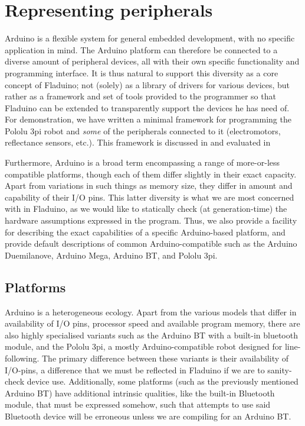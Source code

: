 \documentclass[a4paper, oneside, final]{memoir}
\let\Fref\undefined
\begin{document}
\section{Representing peripherals} 

Arduino is a flexible system for general embedded development, with no
specific application in mind.  The Arduino platform can therefore be
connected to a diverse amount of peripheral devices, all with their
own specific functionality and programming interface.  It is thus
natural to support this diversity as a core concept of Fladuino; not
(solely) as a library of drivers for various devices, but rather as a
framework and set of tools provided to the programmer so that Fladuino
can be extended to transparently support the devices he has need of.
For demonstration, we have written a minimal framework for programming
the Pololu 3pi robot and \textit{some} of the peripherals connected to
it (electromotors, reflectance sensors, etc.). This framework is
discussed in \Fref[plain]{chap:example code} and evaluated in
\Fref[plain]{chap:evaluation}

Furthermore, Arduino is a broad term encompassing a range of
more-or-less compatible platforms, though each of them differ slightly
in their exact capacity.  Apart from variations in such things as
memory size, they differ in amount and capability of their I/O pins.
This latter diversity is what we are most concerned with in Fladuino,
as we would like to statically check (at generation-time) the hardware
assumptions expressed in the program.  Thus, we also provide a
facility for describing the exact capabilities of a specific
Arduino-based platform, and provide default descriptions of common
Arduino-compatible such as the Arduino Duemilanove, Arduino Mega,
Arduino BT, and Pololu 3pi.



\subsection{Platforms}
\label{sec:platforms}

Arduino is a heterogeneous ecology.  Apart from the various models
that differ in availability of I/O pins, processor speed and available
program memory, there are also highly specialised variants such as the
Arduino BT with a built-in bluetooth module, and the Pololu 3pi, a
mostly Arduino-compatible robot designed for line-following.  The
primary difference between these variants is their availability of
I/O-pins, a difference that we must be reflected in Fladuino if we are
to sanity-check device use.  Additionally, some platforms (such as the
previously mentioned Arduino BT) have additional intrinsic qualities,
like the built-in Bluetooth module, that must be expressed somehow,
such that attempts to use said Bluetooth device will be erroneous
unless we are compiling for an Arduino BT.
\end{document}
